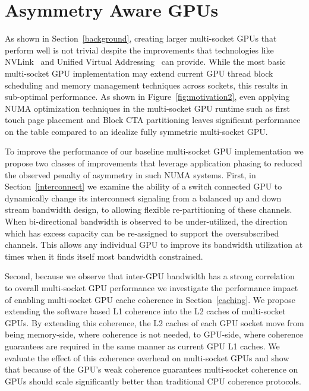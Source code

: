\section{Asymmetry Aware GPUs}

As shown in Section~\ref{background}, creating larger multi-socket GPUs that 
perform well is not trivial despite the improvements that technologies like 
NVLink~\cite{NVLINK} and Unified Virtual Addressing~\cite{UVM} can provide. 
While the most basic multi-socket GPU implementation may extend current GPU 
thread block scheduling and memory management techniques across sockets, this 
results in sub-optimal performance.  As shown in Figure~\ref{fig:motivation2}, 
even applying NUMA optimization techniques in the multi-socket GPU runtime such 
as first touch page placement and Block CTA partitioning leaves significant 
performance on the table compared to an idealize fully symmetric multi-socket 
GPU.

To improve the performance of our baseline multi-socket GPU implementation we 
propose two classes of improvements that leverage application phasing to reduced 
the observed penalty of asymmetry in such NUMA systems.  First, in 
Section~\ref{interconnect} we examine the ability of a switch connected GPU to 
dynamically change its interconnect signaling from a balanced up and down 
stream bandwidth design, to allowing flexible re-partitioning of these channels.  
When bi-directional bandwidth is observed to be under-utilized, the direction 
which has excess capacity can be re-assigned to support the oversubscribed 
channels. This allows any individual GPU to improve its bandwidth utilization at 
times when it finds itself most bandwidth constrained.

Second, because we observe that inter-GPU bandwidth has a strong correlation to 
overall multi-socket GPU performance we investigate the performance impact of 
enabling multi-socket GPU cache coherence in Section~\ref{caching}.  We propose 
extending the software based L1 coherence into the L2 caches of multi-socket 
GPUs.  By extending this coherence, the L2 caches of each GPU socket move from 
being memory-side, where coherence is not needed, to GPU-side, where coherence 
guarantees are required in the same manner as current GPU L1 caches.  We 
evaluate the effect of this coherence overhead on multi-socket GPUs and show 
that because of the GPU's weak coherence guarantees multi-socket coherence on 
GPUs should scale significantly better than traditional CPU coherence protocols.

